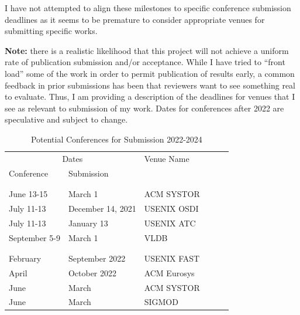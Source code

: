 I have not attempted to align these milestones to specific conference submission
deadlines as it seems to be premature to consider appropriate venues for
submitting specific works.

\textbf{Note:} there is a realistic likelihood that this project will not
achieve a uniform rate of publication submission and/or acceptance.  While I
have tried to ``front load'' some of the work in order to permit publication of
results early, a common feedback in prior submissions has been that reviewers
want to see something real to evaluate.  Thus, I am providing a description of
the deadlines for venues that I see as relevant to submission of my work.  Dates
for conferences after 2022 are speculative and subject to change.

\begin{table}
    \centering
    \caption{Potential Conferences for Submission 2022-2024}
    \label{table:conferences}
    {\renewcommand{\arraystretch}{1.3} %
        \begin{tabular}{p{4cm}p{4cm}p{4cm}ccl}
            \multicolumn{2}{c}{Dates} & Venue Name                       \\
            Conference                & Submission                       \\
            \\
            \rowcolor[rgb]{ .751,  .751,  .751} \multicolumn{3}{c}{2022} \\
            June 13-15                & March 1           & ACM SYSTOR   \\
            July 11-13                & December 14, 2021 & USENIX OSDI  \\
            July 11-13                & January 13        & USENIX ATC   \\
            September 5-9             & March 1           & VLDB         \\
            \\
            \rowcolor[rgb]{ .751,  .751,  .751} \multicolumn{3}{c}{2023} \\
            February                  & September 2022    & USENIX FAST  \\
            April                     & October 2022      & ACM Eurosys  \\
            June                      & March             & ACM SYSTOR   \\
            June                      & March             & SIGMOD       \\

\end{tabular}}
\end{table}
